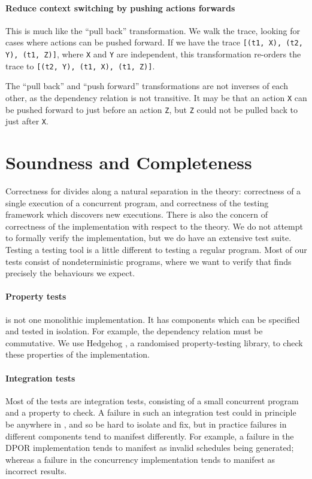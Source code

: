 \paragraph{Reduce context switching by pushing actions forwards}
This is much like the ``pull back'' transformation.  We walk the
trace, looking for cases where actions can be pushed forward.  If we
have the trace \verb|[(t1, X), (t2, Y), (t1, Z)]|, where \verb|X| and
\verb|Y| are independent, this transformation re-orders the trace to
\verb|[(t2, Y), (t1, X), (t1, Z)]|.

The ``pull back'' and ``push forward'' transformations are not
inverses of each other, as the dependency relation is not transitive.
It may be that an action \verb|X| can be pushed forward to just before
an action \verb|Z|, but \verb|Z| could not be pulled back to just
after \verb|X|.

\section{Soundness and Completeness}
\label{sec:dejafu-correctness}

Correctness for \dejafu{} divides along a natural separation in the
theory: correctness of a single execution of a concurrent program, and
correctness of the testing framework which discovers new executions.
There is also the concern of correctness of the implementation with
respect to the theory.  We do not attempt to formally verify the
implementation, but we do have an extensive test suite.  Testing a
testing tool is a little different to testing a regular program.  Most
of our tests consist of nondeterministic programs, where we want to
verify that \dejafu{} finds precisely the behaviours we expect.

\paragraph{Property tests}
\dejafu{} is not one monolithic implementation.  It has components
which can be specified and tested in isolation.  For example, the
dependency relation must be commutative.  We use
Hedgehog \parencite{hedgehog}, a randomised property-testing library, to
check these properties of the implementation.

\paragraph{Integration tests}
Most of the tests are integration tests, consisting of a small
concurrent program and a property to check.  A failure in such an
integration test could in principle be anywhere in \dejafu{}, and so
be hard to isolate and fix, but in practice failures in different
components tend to manifest differently.  For example, a failure in
the DPOR implementation tends to manifest as invalid schedules being
generated; whereas a failure in the concurrency implementation tends
to manifest as incorrect results.

